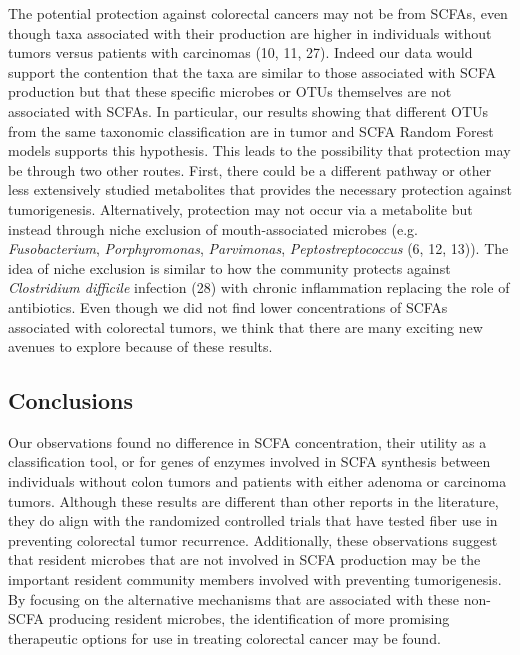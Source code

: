 \documentclass[11pt,]{article}
\begin{document}
The potential protection against colorectal cancers may not be from
SCFAs, even though taxa associated with their production are higher in
individuals without tumors versus patients with carcinomas (10, 11, 27).
Indeed our data would support the contention that the taxa are similar
to those associated with SCFA production but that these specific
microbes or OTUs themselves are not associated with SCFAs. In
particular, our results showing that different OTUs from the same
taxonomic classification are in tumor and SCFA Random Forest models
supports this hypothesis. This leads to the possibility that protection
may be through two other routes. First, there could be a different
pathway or other less extensively studied metabolites that provides the
necessary protection against tumorigenesis. Alternatively, protection
may not occur via a metabolite but instead through niche exclusion of
mouth-associated microbes (e.g. \emph{Fusobacterium},
\emph{Porphyromonas}, \emph{Parvimonas}, \emph{Peptostreptococcus} (6,
12, 13)). The idea of niche exclusion is similar to how the community
protects against \emph{Clostridium difficile} infection (28) with
chronic inflammation replacing the role of antibiotics. Even though we
did not find lower concentrations of SCFAs associated with colorectal
tumors, we think that there are many exciting new avenues to explore
because of these results.

\newpage

\subsection{Conclusions}\label{conclusions}

Our observations found no difference in SCFA concentration, their
utility as a classification tool, or for genes of enzymes involved in
SCFA synthesis between individuals without colon tumors and patients
with either adenoma or carcinoma tumors. Although these results are
different than other reports in the literature, they do align with the
randomized controlled trials that have tested fiber use in preventing
colorectal tumor recurrence. Additionally, these observations suggest
that resident microbes that are not involved in SCFA production may be
the important resident community members involved with preventing
tumorigenesis. By focusing on the alternative mechanisms that are
associated with these non-SCFA producing resident microbes, the
identification of more promising therapeutic options for use in treating
colorectal cancer may be found.
\end{document}
